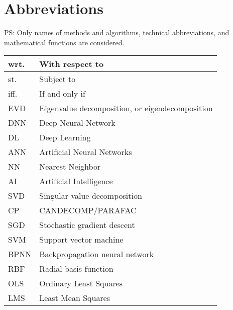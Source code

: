 \section{Abbreviations}
PS: Only names of methods and algorithms, technical abbreviations, and mathematical functions are considered.

\begin{xltabular}{\textwidth}{XX}
	wrt. & With respect to                                                                      \\ \hline
	st.  & Subject to                                                                           \\ \hline
	iff. & If and only if                                                                       \\ \hline
	EVD  & Eigenvalue decomposition, or eigendecomposition \cite{nossekAdaptiveArraySignal2015} \\ \hline
    DNN & Deep Neural Network \\ \hline
    DL & Deep Learning \\ \hline
    ANN & Artificial Neural Networks \cite{goodfellowDeepLearning2016} \\ \hline
    NN & Nearest Neighbor \\ \hline
    AI & Artificial Intelligence \\ \hline
	SVD  & Singular value decomposition                                                         \\ \hline
	CP   & CANDECOMP/PARAFAC                                                                    \\ \hline
	SGD  & Stochastic gradient descent                                                          \\ \hline
	SVM  & Support vector machine                                                               \\ \hline
	BPNN & Backpropagation neural network \cite{jiaoAutomaticEquatorialGPS2017}                 \\ \hline
	RBF  & Radial basis function                                                                \\ \hline
	OLS  & Ordinary Least Squares                                                                \\ \hline
	LMS  & Least Mean Squares                                                                \\ \hline
\end{xltabular}